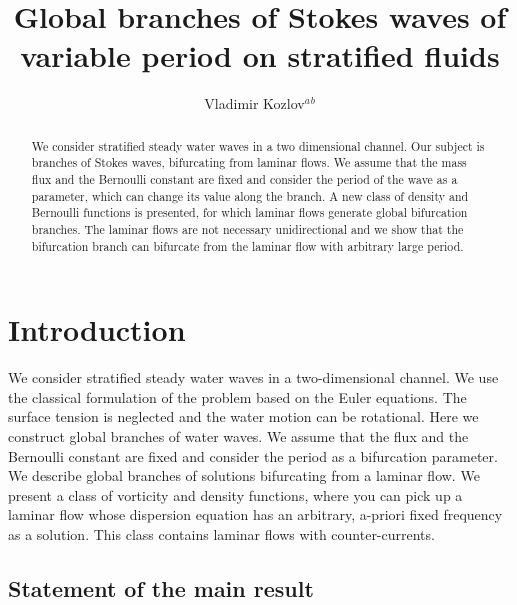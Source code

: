 \documentclass[a4paper,reqno,12pt]{amsart}
\title[Global branches of Stokes waves of variable period on stratified fluids]
{Global branches of Stokes waves of variable period on stratified fluids}
\author{Vladimir Kozlov$^a$$^b$}
\theoremstyle{plain}
\theoremstyle{definition}
\numberwithin{equation}{section}
\begin{document}
	
\begin{abstract}
We consider stratified steady water waves in a two dimensional channel. Our subject is branches of Stokes waves, bifurcating from laminar flows. We assume that the mass flux and the Bernoulli constant are fixed and consider the period of the wave as a parameter, which can change its value along the branch. A new class of density and Bernoulli functions is presented, for which laminar flows generate global bifurcation branches.
 The laminar flows are not necessary unidirectional and we show that the bifurcation branch can bifurcate from the laminar flow with arbitrary large period.


\end{abstract}

\maketitle

\section{Introduction}

We consider stratified steady water waves in a two-dimensional channel.
We use the classical formulation of the problem based on the Euler equations.
The surface tension is neglected and the water motion can be rotational.
Here we construct global branches of water waves. We assume that the flux and the Bernoulli constant are fixed and consider the period as a bifurcation parameter. We describe global branches of solutions bifurcating from a laminar flow.
We present a class of vorticity and density functions, where you can pick up a laminar flow whose dispersion equation has an arbitrary, a-priori fixed frequency as a solution. This class contains laminar flows with counter-currents.












\subsection{Statement of the main result}\label{SOkt11a}
\end{document}
